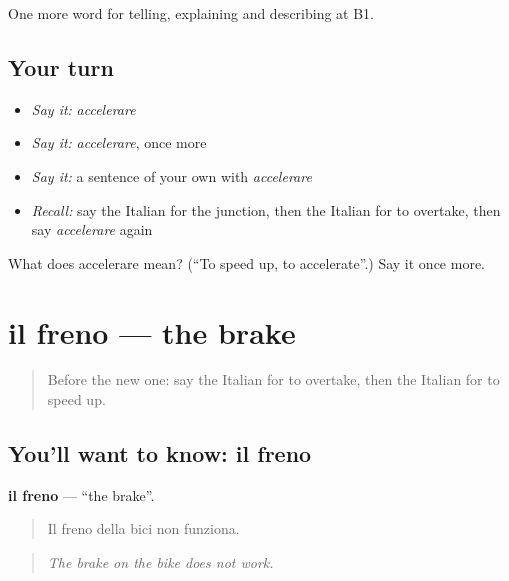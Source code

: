\begin{grammarlens}[title={What you've built}]
One more word for telling, explaining and describing at B1.
\end{grammarlens}

\subsection*{Your turn}
\begin{itemize}
\raggedright
  \item \emph{Say it:} \emph{accelerare}
  \item \emph{Say it:} \emph{accelerare}, once more
  \item \emph{Say it:} a sentence of your own with \emph{accelerare}
  \item \emph{Recall:} say the Italian for the junction, then the Italian for to overtake, then say \emph{accelerare} again
\end{itemize}

\begin{tcolorbox}[breakable,colback=teal!4,colframe=teal!35!black,title={Before you move on}]
What does accelerare mean? (\textquotedblleft{}To speed up, to accelerate\textquotedblright{}.) Say it once more.
\end{tcolorbox}
\section[il freno]{il freno — the brake}

\label{lesson:IT-C406-freno}



\begin{quote}
Before the new one: say the Italian for to overtake, then the Italian for to speed up.
\end{quote}

\subsection*{You'll want to know: il freno}
\textbf{il freno} — \textquotedblleft{}the brake\textquotedblright{}.

\begin{quote}
Il freno della bici non funziona.
\end{quote}

\begin{quote}
\emph{The brake on the bike does not work.}
\end{quote}


